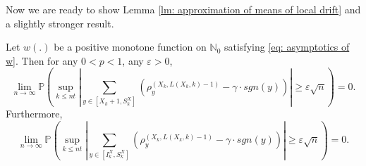 \documentclass[EJP]{ejpecp} %
\newcommand{\abs}[1]{\left\vert #1 \right\vert}
\begin{document}
%		
Now we are ready to show Lemma \ref{lm: approximation of means of local drift}
and a slightly stronger result.
\begin{lemma}
	Let $w(.)$ be a positive monotone function on $\mathbb{N}_0$ satisfying \eqref{eq: asymptotics of w}. Then for any $0<p<1$, any $\varepsilon>0$,
	\[
	\lim_{n\to\infty} \mathbb{P}\left( \sup_{k\leq n t}  \abs{  	\sum_{y\in \left[X_{k}+1 ,S_{k}^X\right]} \left( \rho^{(X_k,L(X_k,k)-1)}_y -  \gamma \cdot sgn(y) \right) } \geq  \varepsilon \sqrt{n}     \right) =0.
	\]
	Furthermore,
	\[
	\lim_{n\to\infty} \mathbb{P}\left( \sup_{k\leq n t}  \abs{  	\sum_{y\in \left[I_k^{X} ,S_{k}^X\right]} \left( \rho^{(X_k,L(X_k,k)-1)}_y -  \gamma \cdot sgn(y) \right) } \geq  \varepsilon \sqrt{n}     \right) =0.
	\]
\end{lemma}
\end{document}
